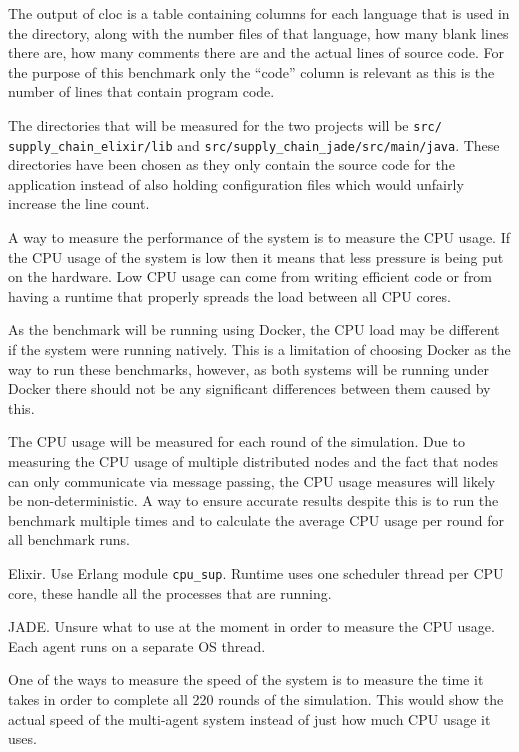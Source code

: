 The output of cloc is a table containing columns for each language that is used in the directory, along with the number files of that language, how many blank lines there are, how many comments there are and the actual lines of source code.
For the purpose of this benchmark only the ``code'' column is relevant as this is the number of lines that contain program code.

The directories that will be measured for the two projects will be \verb|src/|\\ \verb|supply_chain_elixir/lib| and \verb|src/supply_chain_jade/src/main/java|.
These directories have been chosen as they only contain the source code for the application instead of also holding configuration files which would unfairly increase the line count.

A way to measure the performance of the system is to measure the CPU usage.
If the CPU usage of the system is low then it means that less pressure is being put on the hardware.
Low CPU usage can come from writing efficient code or from having a runtime that properly spreads the load between all CPU cores.

As the benchmark will be running using Docker, the CPU load may be different if the system were running natively.
This is a limitation of choosing Docker as the way to run these benchmarks, however, as both systems will be running under Docker there should not be any significant differences between them caused by this.

The CPU usage will be measured for each round of the simulation.
Due to measuring the CPU usage of multiple distributed nodes and the fact that nodes can only communicate via message passing, the CPU usage measures will likely be non-deterministic.
A way to ensure accurate results despite this is to run the benchmark multiple times and to calculate the average CPU usage per round for all benchmark runs.

Elixir.
Use Erlang module \verb|cpu_sup|.
Runtime uses one scheduler thread per CPU core, these handle all the processes that are running.

JADE\@.
Unsure what to use at the moment in order to measure the CPU usage.
Each agent runs on a separate OS thread.

One of the ways to measure the speed of the system is to measure the time it takes in order to complete all 220 rounds of the simulation.
This would show the actual speed of the multi-agent system instead of just how much CPU usage it uses.

